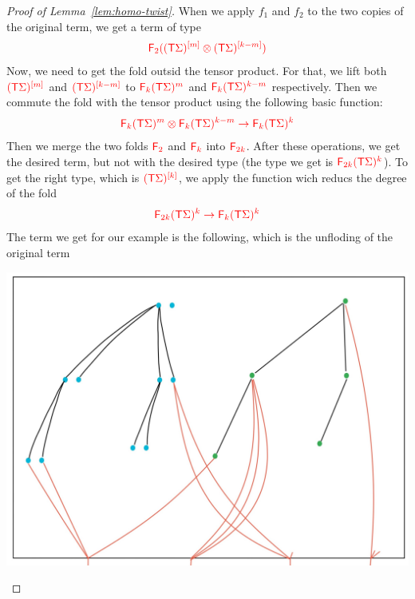 \begin{proof}[Proof of Lemma~\ref{lem:homo-twist}]
When we apply $f_1$ and $f_2$ to the two copies of the original term, we get a term of type 
\begin{align*}
\ranked{ \reduce 2 (\mati m {(\tmonad \Sigma)}\otimes  \mati {k-m} {(\tmonad\Sigma)})}
\end{align*}
Now, we need to get the fold outsid the tensor product. For that, we lift both $\ranked{\mati m {(\tmonad \Sigma)}}$ and $\ranked{\mati {k-m} {(\tmonad \Sigma)}}$ to $\ranked{\reduce k (\tmonad \Sigma)^m}$ and $\ranked{\reduce k (\tmonad \Sigma)^{k-m}}$ respectively. Then we commute the fold with the tensor product using the following basic function:
\begin{align*}
\ranked{\reduce k (\tmonad \Sigma)^m\otimes\reduce k (\tmonad \Sigma)^{k-m}\to \reduce k (\tmonad \Sigma)^k}
\end{align*}
Then we merge the two  folds $\reduce 2$ and $\reduce k$ into $\reduce {2k}$. After these operations, we get the desired term, but not with the desired type (the type we get is $\ranked{\reduce {2k} (\tmonad\Sigma)^k}$). To get the right type, which is $\ranked{\mati k {(\tmonad\Sigma)}}$, we apply the  function wich reducs the degree of the fold
\begin{align*}
\ranked{\reduce {2k} (\tmonad \Sigma)^k \to \reduce {k} (\tmonad \Sigma)^k}
 \end{align*}
 The term we get for our example is the following, which is the unfloding of the original term
 \begin{center}
 \includegraphics[scale=.08]{MyPic31.jpg}
 \end{center}


\end{proof}
